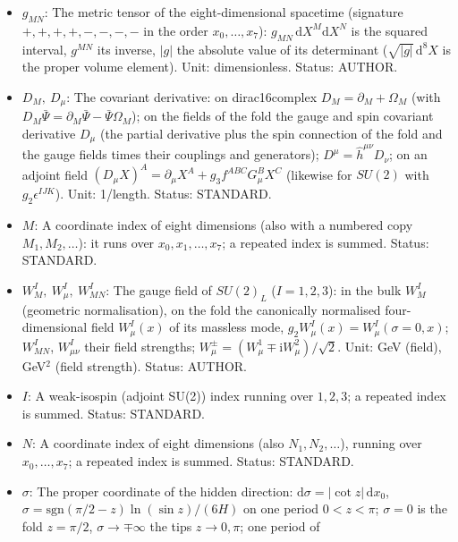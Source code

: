 \documentclass[
  10pt,
]{article}
\providecommand{\tightlist}{%
  \setlength{\itemsep}{0pt}\setlength{\parskip}{0pt}}
\begin{document}
\begin{itemize}
\tightlist
\item
  \(g_{MN}\): The metric tensor of the eight-dimensional spacetime
  (signature \(+,+,+,+,-,-,-,-\) in the order \(x_0, \dots, x_7\)):
  \(g_{MN}\,\mathrm{d}X^M\mathrm{d}X^N\) is the squared interval,
  \(g^{MN}\) its inverse, \(\lvert g\rvert\) the absolute value of its
  determinant (\(\sqrt{\lvert g\rvert}\,\mathrm{d}^8X\) is the proper
  volume element). Unit: dimensionless. Status: AUTHOR.
\item
  \(D_M,\ D_\mu\): The covariant derivative: on dirac16complex
  \(D_M = \partial_M + \Omega_M\) (with
  \(D_M\bar\Psi = \partial_M\bar\Psi - \bar\Psi\Omega_M\)); on the
  fields of the fold the gauge and spin covariant derivative \(D_\mu\)
  (the partial derivative plus the spin connection of the fold and the
  gauge fields times their couplings and generators);
  \(D^\mu = \hat h^{\mu\nu}D_\nu\); on an adjoint field
  \((D_\mu X)^A = \partial_\mu X^A + g_3f^{ABC}G^B_\mu X^C\) (likewise
  for \(SU(2)\) with \(g_2\epsilon^{IJK}\)). Unit: 1/length. Status:
  STANDARD.
\item
  \(M\): A coordinate index of eight dimensions (also with a numbered
  copy \(M_1, M_2, \dots\)): it runs over \(x_0, x_1, \dots, x_7\); a
  repeated index is summed. Status: STANDARD.
\item
  \(W^I_M,\ W^I_\mu,\ W^I_{MN}\): The gauge field of \(SU(2)_L\)
  (\(I = 1, 2, 3\)): in the bulk \(W^I_M\) (geometric normalisation), on
  the fold the canonically normalised four-dimensional field
  \(W^I_\mu(x)\) of its massless mode,
  \(g_2W^I_\mu(x) = W^I_\mu(\sigma = 0, x)\); \(W^I_{MN}\),
  \(W^I_{\mu\nu}\) their field strengths;
  \(W^\pm_\mu = (W^1_\mu \mp \mathrm{i}W^2_\mu)/\sqrt2\). Unit: GeV
  (field), GeV\(^2\) (field strength). Status: AUTHOR.
\item
  \(I\): A weak-isospin (adjoint SU(2)) index running over \(1, 2, 3\);
  a repeated index is summed. Status: STANDARD.
\item
  \(N\): A coordinate index of eight dimensions (also
  \(N_1, N_2, \dots\)), running over \(x_0, \dots, x_7\); a repeated
  index is summed. Status: STANDARD.
\item
  \(\sigma\): The proper coordinate of the hidden direction:
  \(\mathrm{d}\sigma = \lvert\cot z\rvert\,\mathrm{d}x_0\),
  \(\sigma = \mathrm{sgn}(\pi/2 - z)\ln(\sin z)/(6H)\) on one period
  \(0 < z < \pi\); \(\sigma = 0\) is the fold \(z = \pi/2\),
  \(\sigma \to \mp\infty\) the tips \(z \to 0, \pi\); one period of

\end{itemize}
\end{document}

